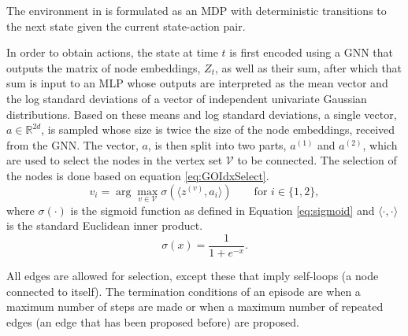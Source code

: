 \documentclass{report}
\newcommand{\reals}{\mbox{\(\mathbb R\)}}
\numberwithin{equation}{section}
\numberwithin{figure}{section}
\numberwithin{table}{section}
\numberwithin{algorithm}{section}
\begin{document}
The environment in \cite{GraphOpt} is formulated as 
an MDP with deterministic transitions to the next state given the 
current state-action pair. 





In order to obtain actions, the state at time $t$ is first encoded
using a GNN that outputs the matrix of node embeddings, $Z_t$, 
as well as their 
sum, after which that sum is input to an MLP whose outputs are 
interpreted as the mean vector and the log standard deviations 
of a vector of independent univariate Gaussian distributions.
Based on these means and log standard deviations, 
a single vector, $a\in \reals^{2d}$, is sampled whose size is 
twice the size of the node embeddings, received from the GNN. 
The vector, $a$, is then split into two parts, $a^{(1)}$ and 
$a^{(2)}$, which are used to select the nodes in the vertex 
set $\mathcal{V}$ to be connected. The selection of the nodes 
is done based on equation \ref{eq:GOIdxSelect}.
\begin{equation}\label{eq:GOIdxSelect}
  v_i = \arg \max_{v\in\mathcal{V}} \sigma(\langle z^{(v)}, a_i\rangle)\qquad \text{for $i\in \{1,2\}$},
\end{equation} 
where $\sigma(\cdot)$ is the sigmoid function as defined in 
Equation \ref{eq:sigmoid} and $\langle\cdot,\cdot\rangle$ is the 
standard Euclidean inner product.
\begin{equation}\label{eq:sigmoid}
  \sigma(x)=\frac{1}{1 + e^{-x}}.
\end{equation}

All edges are allowed for selection, except these that imply 
self-loops (a node connected to itself). The termination 
conditions of an episode are when a maximum number of steps are 
made or when a maximum number of repeated edges (an 
edge that has been proposed before) are proposed.
\end{document}

